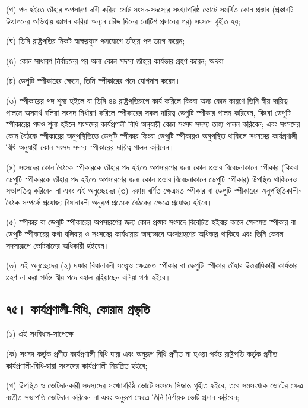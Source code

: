 \documentclass[11pt]{article}
\begin{document}
(গ) পদ হইতে তাঁহার অপসারণ দাবী করিয়া মোট সংসদ-সদস্যের সংখ্যাগরিষ্ঠ ভোটে
    সমর্থিত কোন প্রস্তাব (প্রস্তাবটি উত্থাপনের অভিপ্রায় জ্ঞাপন করিয়া অন্যূন চৌদ্দ
    দিনের নোটিশ প্রদানের পর) সংসদে গৃহীত হয়;

(ঘ) তিনি রাষ্ট্রপতির নিকট স্বাক্ষরযুক্ত পত্রযোগে তাঁহার পদ ত্যাগ করেন;

(ঙ) কোন সাধারণ নির্বাচনের পর অন্য কোন সদস্য তাঁহার কার্যভার গ্রহণ করেন; অথবা

(চ) ডেপুটি স্পীকারের ক্ষেত্রে, তিনি স্পীকারের পদে যোগদান করেন।

(৩) স্পীকারের পদ শূন্য হইলে বা তিনি ৪৪ রাষ্ট্রপতিরূপে কার্য করিলে কিংবা অন্য
    কোন কারণে তিনি স্বীয় দায়িত্ব পালনে অসমর্থ বলিয়া সংসদ নির্ধারণ করিলে
    স্পীকারের সকল দায়িত্ব ডেপুটি স্পীকার পালন করিবেন, কিংবা ডেপুটি স্পীকারের পদও
    শূন্য হইলে সংসদের কার্যপ্রণালী-বিধি-অনুযায়ী কোন সংসদ-সদস্য তাহা পালন করিবেন;
    এবং সংসদের কোন বৈঠকে স্পীকারের অনুপস্থিতিতে ডেপুটি স্পীকার কিংবা ডেপুটি
    স্পীকারও অনুপস্থিত থাকিলে সংসদের কার্যপ্রণালী-বিধি-অনুযায়ী কোন সংসদ-সদস্য
    স্পীকারের দায়িত্ব পালন করিবেন।

(৪) সংসদের কোন বৈঠকে স্পীকারকে তাঁহার পদ হইতে অপসারণের জন্য কোন প্রস্তাব
    বিবেচনাকালে স্পীকার (কিংবা ডেপুটি স্পীকারকে তাঁহার পদ হইতে অপসারণের জন্য
    কোন প্রস্তাব বিবেচনাকালে ডেপুটি স্পীকার) উপস্থিত থাকিলেও সভাপতিত্ব করিবেন না
    এবং এই অনুচ্ছেদের (৩) দফায় বর্ণিত ক্ষেত্রমত স্পীকার বা ডেপুটি স্পীকারের
    অনুপস্থিতিকালীন বৈঠক সম্পর্কে প্রযোজ্য বিধানাবলী অনুরূপ প্রত্যেক বৈঠকের ক্ষেত্রে
    প্রযোজ্য হইবে।

(৫) স্পীকার বা ডেপুটি স্পীকারের অপসারণের জন্য কোন প্রস্তাব সংসদে বিবেচিত
    হইবার কালে ক্ষেত্রমত স্পীকার বা ডেপুটি স্পীকারের কথা বলিবার ও সংসদের
    কার্যধারায় অন্যভাবে অংশগ্রহণের অধিকার থাকিবে এবং তিনি কেবল সদস্যরূপে
    ভোটদানের অধিকারী হইবেন।

(৬) এই অনুচ্ছেদের (২) দফার বিধানাবলী সত্ত্বেও ক্ষেত্রমত স্পীকার বা ডেপুটি
    স্পীকার তাঁহার উত্তরাধিকারী কার্যভার গ্রহণ না করা পর্যন্ত স্বীয় পদে বহাল
    রহিয়াছেন বলিয়া গণ্য হইবে।

\subsection{৭৫। কার্যপ্রণালী-বিধি, কোরাম প্রভৃতি}
\label{sec:org22c89dd}
(১) এই সংবিধান-সাপেক্ষে

(ক) সংসদ কর্তৃক প্রণীত কার্যপ্রণালী-বিধি-দ্বারা এবং অনুরূপ বিধি প্রণীত না হওয়া
    পর্যন্ত রাষ্ট্রপতি কর্তৃক প্রণীত কার্যপ্রণালী-বিধি-দ্বারা সংসদের কার্যপ্রণালী
    নিয়ন্ত্রিত হইবে;

(খ) উপস্থিত ও ভোটদানকারী সদস্যদের সংখ্যাগরিষ্ঠ ভোটে সংসদে সিদ্ধান্ত গৃহীত
    হইবে, তবে সমসংখ্যক ভোটের ক্ষেত্র ব্যতীত সভাপতি ভোটদান করিবেন না এবং অনুরূপ
    ক্ষেত্রে তিনি নির্ণায়ক ভোট প্রদান করিবেন;
\end{document}
